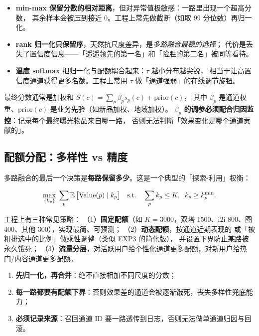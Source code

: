 \begin{insight}
\begin{itemize}
  \item \textbf{min-max 保留分数的相对距离}，但对异常值极敏感：一路里出现一个超高分数，
        其余样本会被压到接近 0。工程上常先做截断（如取 99 分位数）再归一化。
  \item \textbf{rank 归一化只保留序}，天然抗尺度差异，是\emph{多路融合最稳的选择}；
        代价是丢失了置信度信息——「遥遥领先的第一名」和「险胜的第二名」被同等看待。
  \item \textbf{温度 softmax} 把归一化与配额耦合起来：$\tau$ 越小分布越尖锐，
        相当于让高置信度通道获得更多名额。工程上常用 $\tau$ 做「通道强弱」的在线调节旋钮。
\end{itemize}
最终分数通常是加权和 $S(c) = \sum_p \beta_p \tilde s_p(c) + \text{prior}(c)$，
其中 $\beta_p$ 是通道权重、$\text{prior}(c)$ 是业务先验（如新品加权、地域加权）。
\textbf{$\beta_p$ 的调参必须配合归因监控}：记录每个最终曝光物品来自哪一路，
否则无法判断「效果变化是哪个通道贡献的」。
\end{insight}

\subsection{配额分配：多样性 vs 精度}

多路融合的最后一个决策是\textbf{每路保留多少}。这是一个典型的「探索-利用」权衡：

\begin{equation}
\max_{\{k_p\}} \; \sum_{p} \operatorname{\mathbb{E}}\big[ \text{Value}(p) \mid k_p \big]
\quad \text{s.t.} \quad \sum_{p} k_p \le K, \; \; k_p \ge k_p^{\min} .
\label{eq:quota}
\end{equation}

工程上有三种常见策略：
（1）\textbf{固定配额}（如 $K = 3000$，双塔 1500、i2i 800、图 400、其他 300），实现最简、可预测；
（2）\textbf{动态配额}，按通道近期表现的  或「被粗排选中的比例」做乘性调整（类似 EXP3 的简化版），
        并设置下界防止某路被永久饿死；
（3）\textbf{流量分层}，对活跃用户给个性化通道更多配额，对新用户给热门/内容通道更多配额。

\begin{keypoint}[多路融合的三条铁律]
\begin{enumerate}
  \item \textbf{先归一化，再合并}：绝不直接相加不同尺度的分数；
  \item \textbf{每一路都要有配额下界}：否则效果差的通道会被逐渐饿死，丧失多样性兜底能力；
  \item \textbf{必须记录来源}：召回通道 ID 要一路透传到日志，否则无法做单通道归因与回滚。
\end{enumerate}
\end{keypoint}

